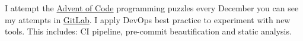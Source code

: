 \descript{ }
I attempt the \href{https://adventofcode.com/}{Advent of Code} programming puzzles every December \textemdash{} you can see my attempts in \href{https://gitlab.com/laywill/}{GitLab}.
I apply DevOps best practice to experiment with new tools. This includes: CI pipeline, pre-commit beautification and static analysis.
\sectionsep{}